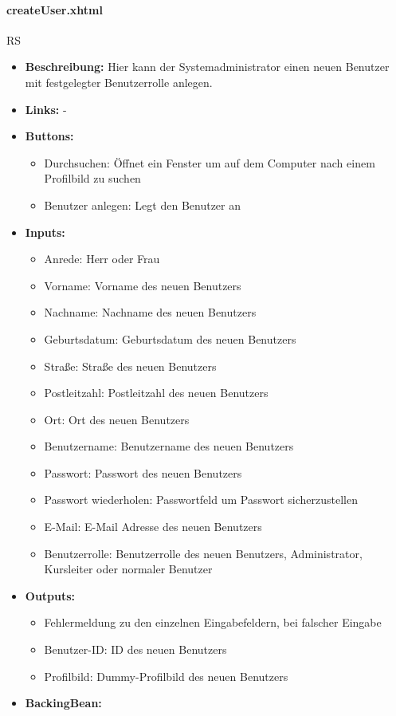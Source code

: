 				\paragraph{createUser.xhtml}
					RS\\
					\begin{itemize}
						\item \textbf{Beschreibung:} Hier kann der Systemadministrator einen neuen Benutzer mit festgelegter Benutzerrolle anlegen.
						\item \textbf{Links:} -
						\item \textbf{Buttons:}
							\begin{itemize}
								\item Durchsuchen: Öffnet ein Fenster um auf dem Computer nach einem Profilbild zu suchen
								\item Benutzer anlegen: Legt den Benutzer an
							\end{itemize}
						\item \textbf{Inputs:}
							\begin{itemize}
								\item Anrede: Herr oder Frau
								\item Vorname: Vorname des neuen Benutzers
								\item Nachname: Nachname des neuen Benutzers
								\item Geburtsdatum: Geburtsdatum des neuen Benutzers
								\item Straße: Straße des neuen Benutzers
								\item Postleitzahl: Postleitzahl des neuen Benutzers
								\item Ort: Ort des neuen Benutzers
								\item Benutzername: Benutzername des neuen Benutzers
								\item Passwort: Passwort des neuen Benutzers
								\item Passwort wiederholen: Passwortfeld um Passwort sicherzustellen
								\item E-Mail: E-Mail Adresse des neuen Benutzers
								\item Benutzerrolle: Benutzerrolle des neuen Benutzers, Administrator, Kursleiter oder normaler Benutzer
							\end{itemize}
						\item \textbf{Outputs:}
							\begin{itemize}
								\item Fehlermeldung zu den einzelnen Eingabefeldern, bei falscher Eingabe
								\item Benutzer-ID: ID des neuen Benutzers
								\item Profilbild: Dummy-Profilbild des neuen Benutzers
							\end{itemize}
						\item \textbf{BackingBean:}
					\end{itemize}
				
